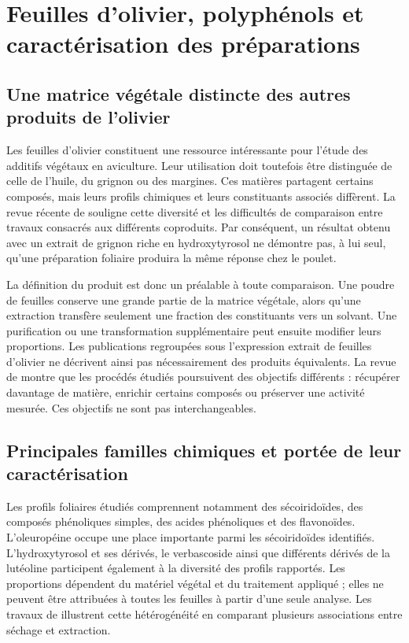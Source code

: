 \section{Feuilles d'olivier, polyphénols et caractérisation des préparations}

\subsection{Une matrice végétale distincte des autres produits de l'olivier}

Les feuilles d'olivier constituent une ressource intéressante pour l'étude des additifs végétaux en aviculture. Leur utilisation doit toutefois être distinguée de celle de l'huile, du grignon ou des margines. Ces matières partagent certains composés, mais leurs profils chimiques et leurs constituants associés diffèrent. La revue récente de \citet{Naseer2026} souligne cette diversité et les difficultés de comparaison entre travaux consacrés aux différents coproduits. Par conséquent, un résultat obtenu avec un extrait de grignon riche en hydroxytyrosol ne démontre pas, à lui seul, qu'une préparation foliaire produira la même réponse chez le poulet.

La définition du produit est donc un préalable à toute comparaison. Une poudre de feuilles conserve une grande partie de la matrice végétale, alors qu'une extraction transfère seulement une fraction des constituants vers un solvant. Une purification ou une transformation supplémentaire peut ensuite modifier leurs proportions. Les publications regroupées sous l'expression \og extrait de feuilles d'olivier\fg{} ne décrivent ainsi pas nécessairement des produits équivalents. La revue de \citet{Debs2023} montre que les procédés étudiés poursuivent des objectifs différents : récupérer davantage de matière, enrichir certains composés ou préserver une activité mesurée. Ces objectifs ne sont pas interchangeables.

\subsection{Principales familles chimiques et portée de leur caractérisation}

Les profils foliaires étudiés comprennent notamment des sécoiridoïdes, des composés phénoliques simples, des acides phénoliques et des flavonoïdes. L'oleuropéine occupe une place importante parmi les sécoiridoïdes identifiés. L'hydroxytyrosol et ses dérivés, le verbascoside ainsi que différents dérivés de la lutéoline participent également à la diversité des profils rapportés. Les proportions dépendent du matériel végétal et du traitement appliqué ; elles ne peuvent être attribuées à toutes les feuilles à partir d'une seule analyse. Les travaux de \citet{CorAndrejc2022} illustrent cette hétérogénéité en comparant plusieurs associations entre séchage et extraction.

